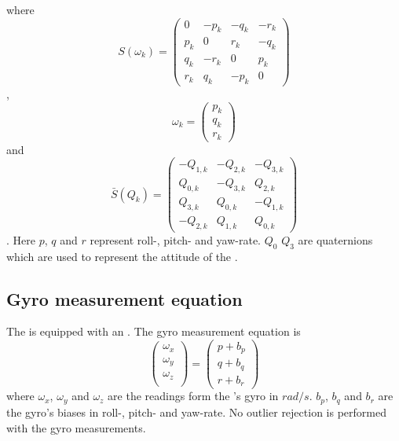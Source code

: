 where
\begin{equation}
S(\omega_{k}) = \begin{pmatrix}
    0 & -p_{k} & -q_{k} & -r_{k} \\
     p_{k} & 0 & r_{k} & -q_{k} \\
     q_{k} & -r_{k} & 0 & p_{k} \\
     r_{k} & q_{k} & -p_{k} &0
\end{pmatrix}
\end{equation},
\begin{equation}
\omega_{k} = \begin{pmatrix}
p_{k}\\
q_{k}\\
r_{k}
\end{pmatrix}
\end{equation}
and
\begin{equation}
\bar{S}(Q_{k}) = \begin{pmatrix}
    -Q_{1,k} & -Q_{2,k} & -Q_{3,k}\\
    Q_{0,k} & -Q_{3,k} &  Q_{2,k}\\
    Q_{3,k} &  Q_{0,k} & -Q_{1,k}\\
    -Q_{2,k} & Q_{1,k} &  Q_{0,k}
\end{pmatrix}
\end{equation}. Here $p$, $q$ and $r$ represent roll-, pitch- and yaw-rate. $Q_0$ \rightarrow $Q_3$ are quaternions which are used to represent the attitude of the \abbROV.




\subsection{Gyro measurement equation}
The \abbrROV is equipped with an \abbrIMU. The gyro measurement equation is 
\begin{equation}
\begin{pmatrix}
\omega_x\\
\omega_y\\
\omega_z\\
\end{pmatrix}= \begin{pmatrix}
p + b_p\\
q + b_q\\
r + b_r
\end{pmatrix}
\end{equation}
where $\omega_x$, $\omega_y$ and $\omega_z$ are the readings form the \abbrIMU's gyro in $rad/s$. $b_p$, $b_q$ and $b_r$ are the gyro's biases in roll-, pitch- and yaw-rate. No outlier rejection is performed with the gyro measurements.

